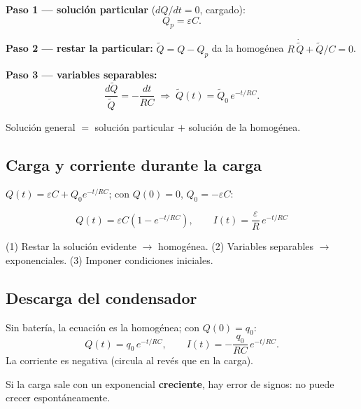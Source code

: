 \documentclass[12pt,a4paper]{article}
\begin{document}
\textbf{Paso 1 --- solución particular} ($dQ/dt=0$, cargado):
\[
Q_p = \varepsilon C.
\]

\textbf{Paso 2 --- restar la particular:} $\tilde{Q} = Q - Q_p$ da la
homogénea $R\,\dot{\tilde{Q}} + \tilde{Q}/C = 0$.

\textbf{Paso 3 --- variables separables:}
\[
\frac{d\tilde{Q}}{\tilde{Q}} = -\frac{dt}{RC}
\;\Longrightarrow\;
\tilde{Q}(t) = \tilde{Q}_0\, e^{-t/RC}.
\]

\begin{notebox}
  Solución general $=$ solución particular $+$ solución de la homogénea.
\end{notebox}

\subsection{Carga y corriente durante la carga}

$Q(t) = \varepsilon C + Q_0 e^{-t/RC}$; con $Q(0)=0$, $Q_0 = -\varepsilon
C$:

\begin{keybox}
  \[
  \boxed{Q(t) = \varepsilon C\left(1 - e^{-t/RC}\right)}, \qquad
  \boxed{I(t) = \frac{\varepsilon}{R}\, e^{-t/RC}}
  \]
\end{keybox}



\begin{notebox}
  (1) Restar la solución evidente $\to$ homogénea. (2) Variables
  separables $\to$ exponenciales. (3) Imponer condiciones iniciales.
\end{notebox}

\subsection{Descarga del condensador}

Sin batería, la ecuación es la homogénea; con $Q(0)=q_0$:
\[
\boxed{Q(t) = q_0\, e^{-t/RC}}, \qquad
I(t) = -\frac{q_0}{RC}\, e^{-t/RC}.
\]
La corriente es negativa (circula al revés que en la carga).

\begin{warnbox}
  Si la carga sale con un exponencial \textbf{creciente}, hay error de
  signos: no puede crecer espontáneamente.
\end{warnbox}


\end{document}
